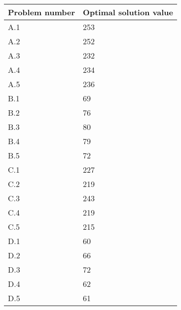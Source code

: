 \begin{tabular}{*{2}{C{65pt}}}
	\toprule
	Problem number & Optimal solution value\\
	\midrule
	A.1 & 253\\
	A.2 & 252\\
	A.3 & 232\\
	A.4 & 234\\
	A.5 & 236\\
	\midrule
	B.1 & 69\\
	B.2 & 76\\
	B.3 & 80\\
	B.4 & 79\\
	B.5 & 72\\
	\midrule
	C.1 & 227\\
	C.2 & 219\\
	C.3 & 243\\
	C.4 & 219\\
	C.5 & 215\\
	\midrule
	D.1 & 60\\
	D.2 & 66\\
	D.3 & 72\\
	D.4 & 62\\
	D.5 & 61\\
	\bottomrule
\end{tabular}